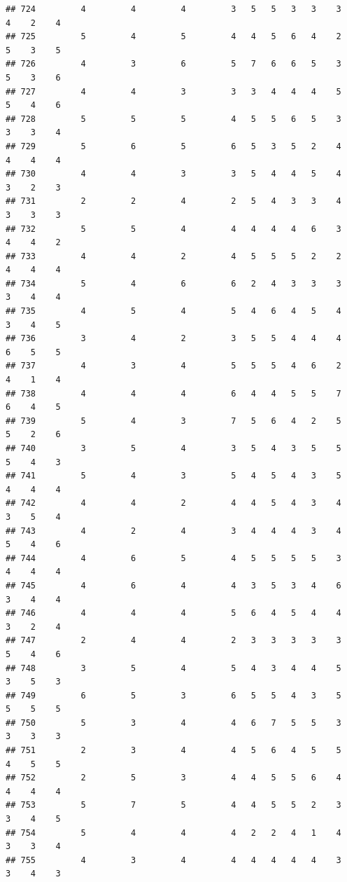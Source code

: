 \documentclass[
]{article}
\begin{document}
\begin{verbatim}
## 724         4         4         4         3   5   5   3   3    3    4    2    4
## 725         5         4         5         4   4   5   6   4    2    5    3    5
## 726         4         3         6         5   7   6   6   5    3    5    3    6
## 727         4         4         3         3   3   4   4   4    5    5    4    6
## 728         5         5         5         4   5   5   6   5    3    3    3    4
## 729         5         6         5         6   5   3   5   2    4    4    4    4
## 730         4         4         3         3   5   4   4   5    4    3    2    3
## 731         2         2         4         2   5   4   3   3    4    3    3    3
## 732         5         5         4         4   4   4   4   6    3    4    4    2
## 733         4         4         2         4   5   5   5   2    2    4    4    4
## 734         5         4         6         6   2   4   3   3    3    3    4    4
## 735         4         5         4         5   4   6   4   5    4    3    4    5
## 736         3         4         2         3   5   5   4   4    4    6    5    5
## 737         4         3         4         5   5   5   4   6    2    4    1    4
## 738         4         4         4         6   4   4   5   5    7    6    4    5
## 739         5         4         3         7   5   6   4   2    5    5    2    6
## 740         3         5         4         3   5   4   3   5    5    5    4    3
## 741         5         4         3         5   4   5   4   3    5    4    4    4
## 742         4         4         2         4   4   5   4   3    4    3    5    4
## 743         4         2         4         3   4   4   4   3    4    5    4    6
## 744         4         6         5         4   5   5   5   5    3    4    4    4
## 745         4         6         4         4   3   5   3   4    6    3    4    4
## 746         4         4         4         5   6   4   5   4    4    3    2    4
## 747         2         4         4         2   3   3   3   3    3    5    4    6
## 748         3         5         4         5   4   3   4   4    5    3    5    3
## 749         6         5         3         6   5   5   4   3    5    5    5    5
## 750         5         3         4         4   6   7   5   5    3    3    3    3
## 751         2         3         4         4   5   6   4   5    5    4    5    5
## 752         2         5         3         4   4   5   5   6    4    4    4    4
## 753         5         7         5         4   4   5   5   2    3    3    4    5
## 754         5         4         4         4   2   2   4   1    4    3    3    4
## 755         4         3         4         4   4   4   4   4    3    3    4    3

\end{verbatim}
\end{document}

